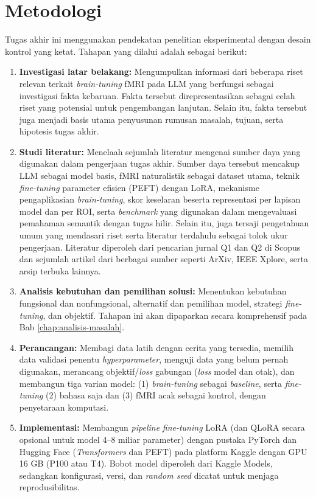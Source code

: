 \section{Metodologi}
Tugas akhir ini menggunakan pendekatan penelitian eksperimental dengan desain kontrol yang ketat. Tahapan yang dilalui adalah sebagai berikut:
\begin{enumerate}
    \item \textbf{Investigasi latar belakang:} Mengumpulkan informasi dari beberapa riset relevan terkait \textit{brain-tuning} fMRI pada LLM yang berfungsi sebagai investigasi fakta kebaruan. Fakta tersebut direpresentasikan sebagai celah riset yang potensial untuk pengembangan lanjutan. Selain itu, fakta tersebut juga menjadi basis utama penyusunan rumusan masalah, tujuan, serta hipotesis tugas akhir. 
    \item \textbf{Studi literatur:} Menelaah sejumlah literatur mengenai sumber daya yang digunakan dalam pengerjaan tugas akhir. Sumber daya tersebut mencakup LLM sebagai model basis, fMRI naturalistik sebagai dataset utama, teknik \textit{fine-tuning} parameter efisien (PEFT) dengan LoRA, mekanisme pengaplikasian \textit{brain-tuning}, skor keselaran beserta representasi per lapisan model dan per ROI, serta \textit{benchmark} yang digunakan dalam mengevaluasi pemahaman semantik dengan tugas hilir. Selain itu, juga tersaji pengetahuan umum yang mendasari riset serta literatur terdahulu sebagai tolok ukur pengerjaan. Literatur diperoleh dari pencarian jurnal Q1 dan Q2 di Scopus dan sejumlah artikel dari berbagai sumber seperti ArXiv, IEEE Xplore, serta arsip terbuka lainnya.
    \item \textbf{Analisis kebutuhan dan pemilihan solusi:} Menentukan kebutuhan fungsional dan nonfungsional, alternatif dan pemilihan model, strategi \textit{fine-tuning}, dan objektif. Tahapan ini akan dipaparkan secara komprehensif pada Bab \ref{chap:analisis-masalah}.
    \item \textbf{Perancangan:} Membagi data latih dengan cerita yang tersedia, memilih data validasi penentu \textit{hyperparameter}, menguji data yang belum pernah digunakan, merancang objektif/\textit{loss} gabungan (\textit{loss} model dan otak), dan membangun tiga varian model: (1) \textit{brain-tuning} sebagai \textit{baseline}, serta \textit{fine-tuning} (2) bahasa saja dan (3) fMRI acak sebagai kontrol, dengan penyetaraan komputasi.
    \item \textbf{Implementasi:} Membangun \textit{pipeline} \textit{fine-tuning} LoRA (dan QLoRA secara opsional untuk model 4--8 miliar parameter) dengan pustaka PyTorch dan Hugging Face (\textit{Transformers} dan PEFT) pada platform Kaggle dengan GPU 16 GB (P100 atau T4). Bobot model diperoleh dari Kaggle Models, sedangkan konfigurasi, versi, dan \textit{random seed} dicatat untuk menjaga reprodusibilitas.

\end{enumerate}
